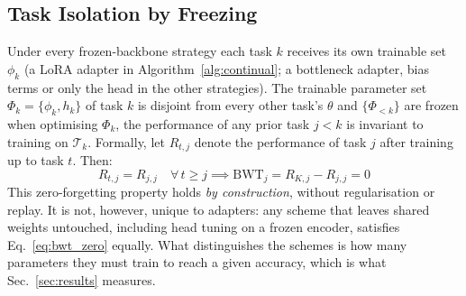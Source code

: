 \iffull\documentclass[journal]{IEEEtran}\else\documentclass[journal,twoside,web]{ieeecolor}\usepackage{generic}\fi
\begin{document}
\subsection{Task Isolation by Freezing}
\label{sec:continual}

Under every frozen-backbone strategy each task $k$ receives its own trainable set $\phi_k$ (a LoRA adapter\iffull{} in Algorithm~\ref{alg:continual}\fi; a bottleneck adapter, bias terms or only the head in the other strategies). The trainable parameter set $\Phi_k = \{\phi_k, h_k\}$ of task $k$ is disjoint from every other task's $\theta$ and $\{\Phi_{<k}\}$ are frozen when optimising $\Phi_k$, the performance of any prior task $j < k$ is invariant to training on $\mathcal{T}_k$. Formally, let $R_{t,j}$ denote the performance of task $j$ after training up to task $t$. Then:
\begin{equation}
R_{t,j} = R_{j,j} \quad \forall \, t \geq j \implies \text{BWT}_j = R_{K,j} - R_{j,j} = 0
\label{eq:bwt_zero}
\end{equation}
This zero-forgetting property holds \emph{by construction}, without regularisation or replay. It is not, however, unique to adapters: any scheme that leaves shared weights untouched, including head tuning on a frozen encoder, satisfies Eq.~\eqref{eq:bwt_zero} equally. What distinguishes the schemes is how many parameters they must train to reach a given accuracy, which is what Sec.~\ref{sec:results} measures. 
\end{document}
